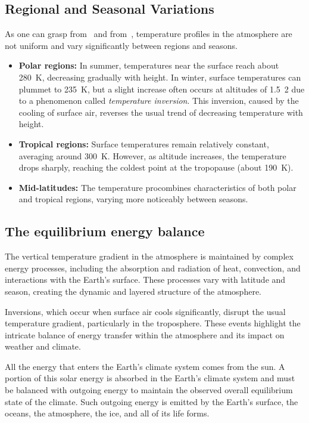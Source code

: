 \subsection{Regional and Seasonal Variations}

As one can grasp from~\fig{\ref{fig:temp-profile-dobson}} and from~\tabref{\ref{tab:atm-temps-layer-latitude}}, temperature profiles in the atmosphere are not uniform and vary significantly between regions and seasons.

\begin{itemize}
	\item \textbf{Polar regions:} In summer, temperatures near the surface reach about 280~K, decreasing gradually with height. In winter, surface temperatures can plummet to 235~K, but a slight increase often occurs at altitudes of \qty{1.5}{2}{\kilo\meter} due to a phenomenon called \emph{temperature inversion}. This inversion, caused by the cooling of surface air, reverses the usual trend of decreasing temperature with height.
	\item \textbf{Tropical regions:} Surface temperatures remain relatively constant, averaging around 300~K. However, as altitude increases, the temperature drops sharply, reaching the coldest point at the tropopause (about 190~K).
	\item \textbf{Mid-latitudes:} The temperature pro\file combines characteristics of both polar and tropical regions, varying more noticeably between seasons.
\end{itemize}


\subsection{The equilibrium energy balance}\label{subsec:equilibrium-energy-balance}

The vertical temperature gradient in the atmosphere is maintained by complex energy processes, including the absorption and radiation of heat, convection, and interactions with the Earth's surface. These processes vary with latitude and season, creating the dynamic and layered structure of the atmosphere.

Inversions, which occur when surface air cools significantly, disrupt the usual temperature gradient, particularly in the troposphere. These events highlight the intricate balance of energy transfer within the atmosphere and its impact on weather and climate.

All the energy that enters the Earth’s climate system comes from the sun.
A portion of this solar energy is absorbed in the Earth's climate system and must be balanced with
outgoing energy to maintain the observed overall equilibrium state of the climate.
Such outgoing energy is emitted by the Earth's surface, the oceans, the atmosphere, the ice, and all of its life forms.

